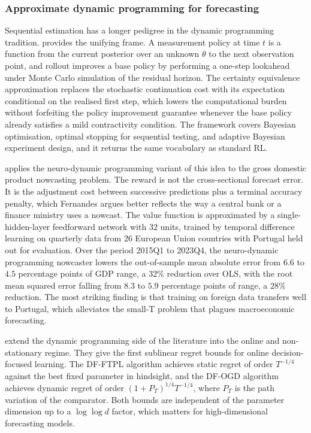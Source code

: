 \subsubsection{Approximate dynamic programming for forecasting}
\label{sec:adp_forecasting}

Sequential estimation has a longer pedigree in the dynamic programming tradition.
\citet{BertsekasRollout2022} provides the unifying frame. A measurement policy at
time $t$ is a function from the current posterior over an unknown $\theta$ to the
next observation point, and rollout improves a base policy by performing a one-step
lookahead under Monte Carlo simulation of the residual horizon. The certainty
equivalence approximation replaces the stochastic continuation cost with its
expectation conditional on the realised first step, which lowers the computational
burden without forfeiting the policy improvement guarantee whenever the base policy
already satisfies a mild contractivity condition. The framework covers Bayesian
optimisation, optimal stopping for sequential testing, and adaptive Bayesian
experiment design, and it returns the same vocabulary as standard RL.

\citet{Fernandes2024} applies the neuro-dynamic programming variant of this idea to
the gross domestic product nowcasting problem. The reward is not the cross-sectional
forecast error. It is the adjustment cost between successive predictions plus a
terminal accuracy penalty, which Fernandes argues better reflects the way a central
bank or a finance ministry uses a nowcast. The value function is approximated by a
single-hidden-layer feedforward network with $32$ units, trained by temporal
difference learning on quarterly data from $26$ European Union countries with
Portugal held out for evaluation. Over the period 2015Q1 to 2023Q4, the neuro-dynamic
programming nowcaster lowers the out-of-sample mean absolute error from $6.6$ to
$4.5$ percentage points of GDP range, a $32\%$ reduction over OLS, with the root
mean squared error falling from $8.3$ to $5.9$ percentage points of range, a $28\%$
reduction. The most striking finding is that training on foreign data transfers well
to Portugal, which alleviates the small-T problem that plagues macroeconomic
forecasting.

\citet{BenAmeur2025} extend the dynamic programming side of the literature into the
online and non-stationary regime. They give the first sublinear regret bounds for
online decision-focused learning. The DF-FTPL algorithm achieves static regret of
order $T^{-1/4}$ against the best fixed parameter in hindsight, and the DF-OGD
algorithm achieves dynamic regret of order $(1 + P_T)^{1/4} T^{-1/4}$, where $P_T$
is the path variation of the comparator. Both bounds are independent of the
parameter dimension up to a $\log \log d$ factor, which matters for high-dimensional
forecasting models.

